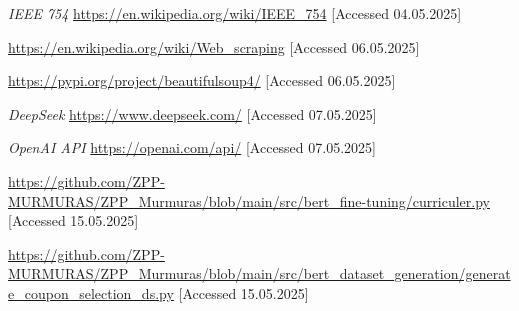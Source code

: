 \documentclass[licencjacka,en]{pracamgr}
\begin{document}
\begin{thebibliography}{99}
\textit{IEEE 754}
\url{https://en.wikipedia.org/wiki/IEEE_754}
[Accessed 04.05.2025]

\url{https://en.wikipedia.org/wiki/Web_scraping}
[Accessed 06.05.2025]

\url{https://pypi.org/project/beautifulsoup4/}
[Accessed 06.05.2025]

\textit{DeepSeek}
\url{https://www.deepseek.com/}
[Accessed 07.05.2025]

\textit{OpenAI API}
\url{https://openai.com/api/}
[Accessed 07.05.2025]

\url{https://github.com/ZPP-MURMURAS/ZPP_Murmuras/blob/main/src/bert_fine-tuning/curriculer.py}
[Accessed 15.05.2025]

\url{https://github.com/ZPP-MURMURAS/ZPP_Murmuras/blob/main/src/bert_dataset_generation/generate_coupon_selection_ds.py}
[Accessed 15.05.2025]

\end{thebibliography}
\end{document}
